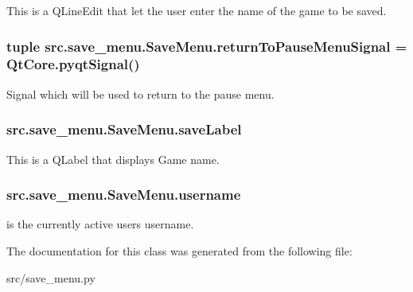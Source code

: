 This is a Q\+Line\+Edit that let the user enter the name of the game to be saved. 

\hypertarget{classsrc_1_1save__menu_1_1_save_menu_a91e3384b3ca4264682fd7cc2fce47b0f}{}
\subsubsection[{return\+To\+Pause\+Menu\+Signal}]{\setlength{\rightskip}{0pt plus 5cm}tuple src.\+save\+\_\+menu.\+Save\+Menu.\+return\+To\+Pause\+Menu\+Signal = Qt\+Core.\+pyqt\+Signal()\hspace{0.3cm}{\ttfamily [static]}}\label{classsrc_1_1save__menu_1_1_save_menu_a91e3384b3ca4264682fd7cc2fce47b0f}


Signal which will be used to return to the pause menu. 

\hypertarget{classsrc_1_1save__menu_1_1_save_menu_aed6ba9a74fc14066593c5ce7b2ae4691}{}
\subsubsection[{save\+Label}]{\setlength{\rightskip}{0pt plus 5cm}src.\+save\+\_\+menu.\+Save\+Menu.\+save\+Label}\label{classsrc_1_1save__menu_1_1_save_menu_aed6ba9a74fc14066593c5ce7b2ae4691}


This is a Q\+Label that displays \textquotesingle{}Game name\textquotesingle{}. 

\hypertarget{classsrc_1_1save__menu_1_1_save_menu_afa694276e009bcb004df7c7a1a5da217}{}
\subsubsection[{username}]{\setlength{\rightskip}{0pt plus 5cm}src.\+save\+\_\+menu.\+Save\+Menu.\+username}\label{classsrc_1_1save__menu_1_1_save_menu_afa694276e009bcb004df7c7a1a5da217}


is the currently active user\textquotesingle{}s username. 



The documentation for this class was generated from the following file\+:\begin{DoxyCompactItemize}
\item 
src/save\+\_\+menu.\+py\end{DoxyCompactItemize}
